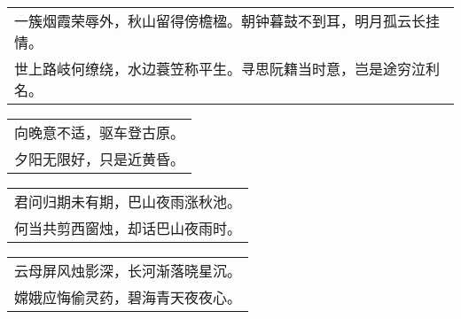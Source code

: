 \nopagebreak%
\nopagebreak%
\noindent\begin{minipage}{\linewidth}
  \vskip-3pt\begin{table}[H]
    \centering
    \begin{tabular}{@{}l@{}}
一簇烟霞荣辱外，秋山留得傍檐楹。朝钟暮鼓不到耳，明月孤云长挂情。\\
世上路岐何缭绕，水边蓑笠称平生。寻思阮籍当时意，岂是途穷泣利名。
    \end{tabular}
  \end{table}
\end{minipage}
\vspace{1cm}


\nopagebreak%
\nopagebreak%
\noindent\begin{minipage}{\linewidth}
  \vskip-3pt\begin{table}[H]
    \centering
    \begin{tabular}{@{}l@{}}
向晚意不适，驱车登古原。\\
夕阳无限好，只是近黄昏。
    \end{tabular}
  \end{table}
\end{minipage}
\vspace{1cm}


\nopagebreak%
\nopagebreak%
\noindent\begin{minipage}{\linewidth}
  \vskip-3pt\begin{table}[H]
    \centering
    \begin{tabular}{@{}l@{}}
君问归期未有期，巴山夜雨涨秋池。\\
何当共剪西窗烛，却话巴山夜雨时。
    \end{tabular}
  \end{table}
\end{minipage}
\vspace{1cm}


\nopagebreak%
\nopagebreak%
\noindent\begin{minipage}{\linewidth}
  \vskip-3pt\begin{table}[H]
    \centering
    \begin{tabular}{@{}l@{}}
云母屏风烛影深，长河渐落晓星沉。\\
嫦娥应悔偷灵药，碧海青天夜夜心。
    \end{tabular}
  \end{table}
\end{minipage}
\vspace{1cm}


